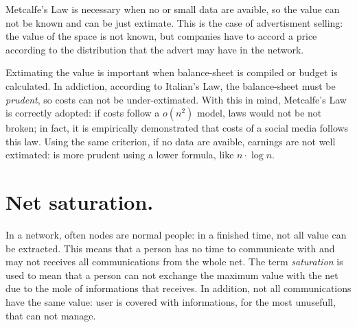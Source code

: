\documentclass[12pt, a4page]{article}
\begin{document}
Metcalfe's Law is necessary when no or small data are avaible, so the value can not be known and can be just extimate.
This is the case of advertisment selling: the value of the space is not known, but companies have to accord a price according to the distribution that the advert may have in the network. \newline
 
Extimating the value is important when balance-sheet is compiled or budget is calculated. In addiction, according to Italian's Law, the balance-sheet must be \textit{prudent}, so costs can not be under-extimated.
With this in mind, Metcalfe's Law is correctly adopted: if costs follow a $o(n^2)$ model, laws would not be not broken; in fact, it is empirically demonstrated that costs of a social media follows this law.
Using the same criterion, if no data are avaible, earnings are not well extimated: is more prudent using a lower formula, like $n \cdot \log{n}$. \newline

\section{Net saturation.}
In a network, often nodes are normal people: in a finished time, not all value can be extracted.
This means that a person has no time to communicate with and may not receives all communications from the whole net.
The term \textit{saturation} is used to mean that a person can not exchange the maximum value with the net due to the mole of informations that receives.
In addition, not all communications have the same value: user is covered with informations, for the most unusefull, that can not manage.


\end{document}
